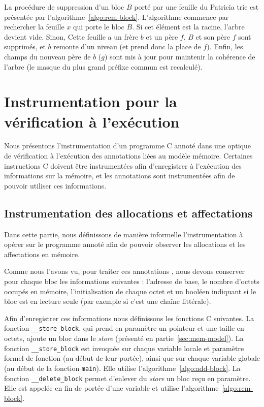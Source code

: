 La procédure de suppression d'un bloc $B$ porté par une feuille du Patricia trie
est présentée par l'algorithme~\ref{algo:rem-block}.
L'algorithme commence par rechercher la feuille $x$ qui porte le bloc $B$.
Si cet élément est la racine, l'arbre devient vide.
Sinon, Cette feuille a un frère $b$ et un père $f$.
$B$ et son père $f$ sont supprimés, et $b$ remonte d'un niveau (et prend donc
la place de $f$).
Enfin, les champs du nouveau père de $b$ ($g$) sont mis à jour pour
maintenir la cohérence de l'arbre (le masque du plus grand préfixe commun est
recalculé).


\section{Instrumentation pour la vérification à l'exécution}
\label{sec:mem-instru}


Nous présentons l'instrumentation d'un programme C annoté dans une optique de
vérification à l'exécution des annotations liées au modèle mémoire.
Certaines instructions C doivent être instrumentées afin d'enregistrer à
l'exécution des informations sur la mémoire, et les annotations sont
instrumentées afin de pouvoir utiliser ces informations.


\subsection{Instrumentation des allocations et affectations}


Dans cette partie, nous définissons de manière informelle l'instrumentation à
opérer sur le programme annoté afin de pouvoir observer les allocations et
les affectations en mémoire.

Comme nous l'avons vu, pour traiter ces annotations \eacsl, nous devons
conserver pour chaque bloc les informations suivantes : l'adresse de base, le
nombre d'octets occupés en mémoire, l'initialisation de chaque octet et un
booléen indiquant si le bloc est en lecture seule (par exemple si c'est une
chaîne littérale).

Afin d'enregistrer ces informations nous définissons les fonctions C suivantes.
La fonction \lstinline'__store_block', qui prend en paramètre un pointeur et une
taille en octets, ajoute un bloc dans le \textit{store} (présenté en
partie~\ref{sec:mem-model}).
La fonction \lstinline'__store_block' est invoquée sur chaque variable locale
et paramètre formel de fonction (au début de leur portée), ainsi que sur chaque
variable globale (au début de la fonction \lstinline'main').
Elle utilise l'algorithme~\ref{algo:add-block}.
La fonction \lstinline'__delete_block' permet d'enlever du \textit{store} un
bloc reçu en paramètre.
Elle est appelée en fin de portée d'une variable et utilise
l'algorithme~\ref{algo:rem-block}.

